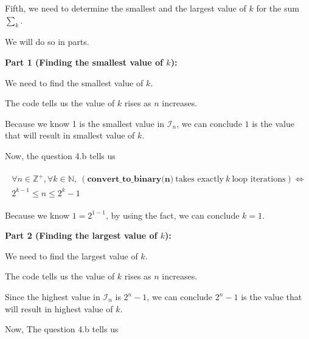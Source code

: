 \documentclass[12pt]{article}
\begin{document}
\begin{enumerate}[a.]
    \bigskip

    Fifth, we need to determine the smallest and the largest value of $k$
    for the sum $\sum\limits_{k}$.

    \bigskip

    We will do so in parts.

    \bigskip

    \textbf{Part 1 (Finding the smallest value of $k$):}

    \bigskip

    We need to find the smallest value of $k$.

    \bigskip

    The code tells us the value of $k$ rises as $n$ increases.

    \bigskip

    Because we know 1 is the smallest value in $\mathcal{I}_n$, we can conclude
    $1$ is the value that will result in smallest value of $k$.

    \bigskip

    Now, the question 4.b tells us

    \begin{align}
        \begin{split}
        \forall n \in \mathbb{Z}^+, \forall k \in \mathbb{N},\: (\textbf{
        convert\_to\_binary(n)}\:\text{takes exactly}\:k\:\text{loop iterations}) \Leftrightarrow
        \\ 2^{k-1} \leq n \leq 2^k -1
        \end{split}
    \end{align}

    Because we know $1 = 2^{1 - 1}$, by using the fact, we can conclude $k = 1$.

    \bigskip

    \textbf{Part 2 (Finding the largest value of $k$):}

    \bigskip

    We need to find the largest value of $k$.

    \bigskip

    The code tells us the value of $k$ rises as $n$ increases.

    \bigskip

    Since the highest value in $\mathcal{I}_n$ is $2^n - 1$, we can conclude
    $2^n - 1$ is the value that will result in highest value of $k$.

    \bigskip

    Now, The question 4.b tells us


\end{enumerate}
\end{document}
